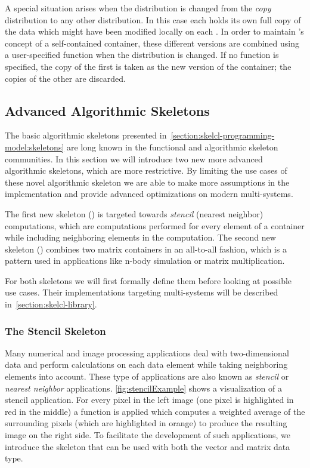 A special situation arises when the distribution is changed from the \emph{copy} distribution to any other distribution.
In this case each \GPU holds its own full copy of the data which might have been modified locally on each \GPU.
In order to maintain \SkelCL's concept of a self-contained container, these different versions are combined using a user-specified function when the distribution is changed.
If no function is specified, the copy of the first \GPU is taken as the new version of the container; the copies of the other \GPUs are discarded.


\subsection{Advanced Algorithmic Skeletons}
\label{section:skelcl-programming-model:specialSkeletons}

The basic algorithmic skeletons presented in~\autoref{section:skelcl-programming-model:skeletons} are long known in the functional and algorithmic skeleton communities.
In this section we will introduce two new more advanced algorithmic skeletons, which are more restrictive.
By limiting the use cases of these novel algorithmic skeleton we are able to make more assumptions in the implementation and provide advanced optimizations on modern multi-\GPU systems.

The first new skeleton (\stencil) is targeted towards \emph{stencil} (\aka nearest neighbor) computations, which are computations performed for every element of a container while including neighboring elements in the computation.
The second new skeleton (\allpairs) combines two matrix containers in an all-to-all fashion, which is a pattern used in applications like n-body simulation or matrix multiplication.

For both skeletons we will first formally define them before looking at possible use cases.
Their implementations targeting multi-\GPU systems will be described in~\autoref{section:skelcl-library}.


\subsubsection{The Stencil Skeleton}
\label{section:stencil:skeleton}

Many numerical and image processing applications deal with two-dimensional data and perform calculations on each data element while taking neighboring elements into account.
These type of applications are also known as \emph{stencil} or \emph{nearest neighbor} applications.
\autoref{fig:stencilExample} shows a visualization of a stencil application.
For every pixel in the left image (one pixel is highlighted in red in the middle) a function is applied which computes a weighted average of the surrounding pixels (which are highlighted in orange) to produce the resulting image on the right side.
To facilitate the development of such applications, we introduce the \stencil skeleton that can be used with both the vector and matrix data type.

